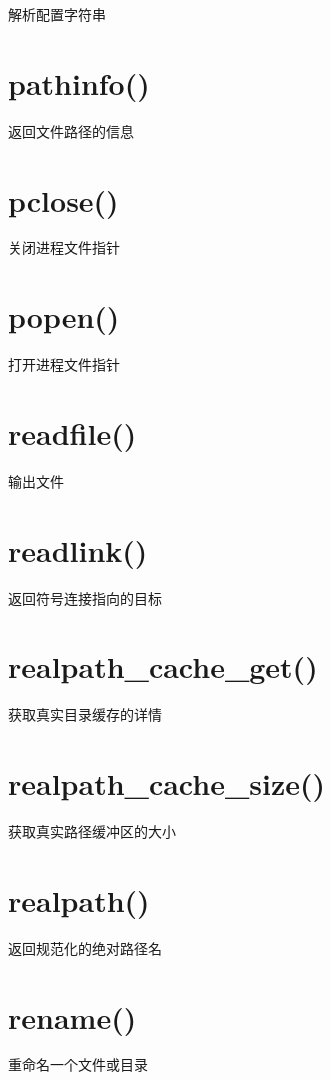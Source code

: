 解析配置字符串

\section{pathinfo()}

返回文件路径的信息

\section{pclose()}

关闭进程文件指针

\section{popen()}

打开进程文件指针

\section{readfile()}

输出文件

\section{readlink()}

返回符号连接指向的目标

\section{realpath\_cache\_get()}

获取真实目录缓存的详情

\section{realpath\_cache\_size()}

获取真实路径缓冲区的大小

\section{realpath()}

返回规范化的绝对路径名

\section{rename()}

重命名一个文件或目录

